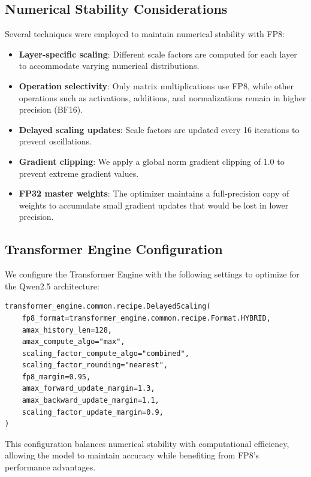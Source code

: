 \subsection{Numerical Stability Considerations}\label{sec:numerical_stability}

Several techniques were employed to maintain numerical stability with FP8:

\begin{itemize}
    \item \textbf{Layer-specific scaling}: Different scale factors are computed for each layer to accommodate varying numerical distributions.
    \item \textbf{Operation selectivity}: Only matrix multiplications use FP8, while other operations such as activations, additions, and normalizations remain in higher precision (BF16).
    \item \textbf{Delayed scaling updates}: Scale factors are updated every 16 iterations to prevent oscillations.
    \item \textbf{Gradient clipping}: We apply a global norm gradient clipping of 1.0 to prevent extreme gradient values.
    \item \textbf{FP32 master weights}: The optimizer maintains a full-precision copy of weights to accumulate small gradient updates that would be lost in lower precision.
\end{itemize}

\subsection{Transformer Engine Configuration}

We configure the Transformer Engine with the following settings to optimize for the Qwen2.5 architecture:

\begin{verbatim}
transformer_engine.common.recipe.DelayedScaling(
    fp8_format=transformer_engine.common.recipe.Format.HYBRID,
    amax_history_len=128,
    amax_compute_algo="max",
    scaling_factor_compute_algo="combined",
    scaling_factor_rounding="nearest",
    fp8_margin=0.95,
    amax_forward_update_margin=1.3,
    amax_backward_update_margin=1.1,
    scaling_factor_update_margin=0.9,
)
\end{verbatim}

This configuration balances numerical stability with computational efficiency, allowing the model to maintain accuracy while benefiting from FP8's performance advantages.

